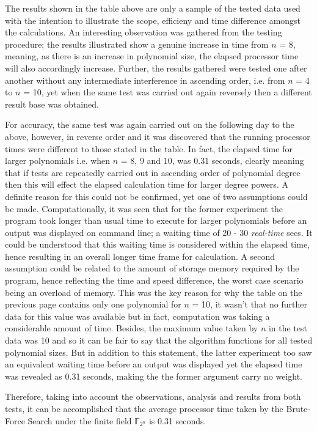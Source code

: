 \documentclass[iwp,first]{luthesis}
\begin{document}
The results shown in the table above are only a sample of the tested data used with the intention to illustrate the scope, efficieny and time difference amongst the calculations. An interesting observation was gathered from the testing procedure; the results illustrated show a genuine increase in time from $n$ = 8, meaning, as there is an increase in polynomial size, the elapsed processor time will also accordingly increase. Further, the results gathered were tested one after another without any intermediate interference in ascending order, i.e. from $n$ = 4 to $n$ = 10, yet when the same test was carried out again reversely then a different result base was obtained. 

For accuracy, the same test was again carried out on the following day to the above, however, in reverse order and it was discovered that the running processor times were different to those stated in the table. In fact, the elapsed time for larger polynomials i.e. when $n$ = 8, 9 and 10, was 0.31 seconds, clearly meaning that if tests are repeatedly carried out in ascending order of polynomial degree then this will effect the elapsed calculation time for larger degree powers. A definite reason for this could not be confirmed, yet one of two assumptions could be made. Computationally, it was seen that for the former experiment the program took longer than usual time to execute for larger polynomials before an output was displayed on command line; a waiting time of 20 - 30 \textit{real-time} secs. It could be understood that this waiting time is considered within the elapsed time, hence resulting in an overall longer time frame for calculation. A second assumption could be related to the amount of storage memory required by the program, hence reflecting the time and speed difference, the worst case scenario being an overload of memory. This was the key reason for why the table on the previous page contains only one polynomial for $n$ = 10, it wasn't that no further data for this value was available but in fact, computation was taking a considerable amount of time. Besides, the maximum value taken by $n$ in the test data was 10 and so it can be fair to say that the algorithm functions for all tested polynomial sizes. But in addition to this statement, the latter experiment too saw an equivalent waiting time before an output was displayed yet the elapsed time was revealed as 0.31 seconds, making the the former argument carry no weight. 

Therefore, taking into account the observations, analysis and results from both tests, it can be accomplished that the average processor time taken by the Brute-Force Search under the finite field $\mathbb{F}_{2^n}$ is 0.31 seconds.
\end{document}
